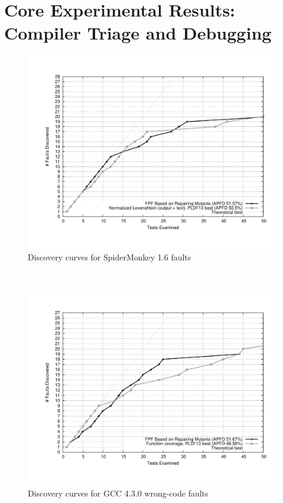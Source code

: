 \section{Core Experimental Results: Compiler Triage and Debugging}

\begin{figure}
    \centering
        \includegraphics[width=1.0\textwidth]{jscurve}
        \caption{Discovery curves for SpiderMonkey 1.6 faults}
        \label{jscurves}
 \end{figure}%
    ~ 
    \begin{figure}
        \centering
        \includegraphics[width=1.0\textwidth]{gcccurve}
        \caption{Discovery curves for GCC 4.3.0 wrong-code faults}
        \label{gcccurves}
\end{figure}


